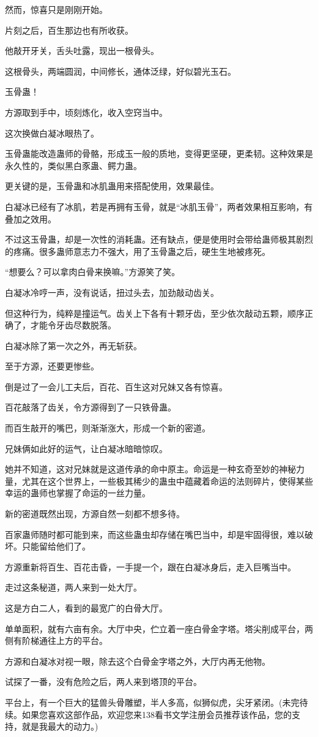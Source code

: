 \begin{this_body}
然而，惊喜只是刚刚开始。

片刻之后，百生那边也有所收获。

他敲开牙关，舌头吐露，现出一根骨头。

这根骨头，两端圆润，中间修长，通体泛绿，好似碧光玉石。

玉骨蛊！

方源取到手中，顷刻炼化，收入空窍当中。

这次换做白凝冰眼热了。

玉骨蛊能改造蛊师的骨骼，形成玉一般的质地，变得更坚硬，更柔韧。这种效果是永久性的，类似黑白豕蛊、鳄力蛊。

更关键的是，玉骨蛊和冰肌蛊用来搭配使用，效果最佳。

白凝冰已经有了冰肌，若是再拥有玉骨，就是“冰肌玉骨”，两者效果相互影响，有叠加之效用。

不过这玉骨蛊，却是一次性的消耗蛊。还有缺点，便是使用时会带给蛊师极其剧烈的疼痛。很多蛊师意志力不强大，用了玉骨蛊之后，硬生生地被疼死。

“想要么？可以拿肉白骨来换嘛。”方源笑了笑。

白凝冰冷哼一声，没有说话，扭过头去，加劲敲动齿关。

但这种行为，纯粹是撞运气。齿关上下各有十颗牙齿，至少依次敲动五颗，顺序正确了，才能令牙齿尽数脱落。

白凝冰除了第一次之外，再无斩获。

至于方源，还要更惨些。

倒是过了一会儿工夫后，百花、百生这对兄妹又各有惊喜。

百花敲落了齿关，令方源得到了一只铁骨蛊。

而百生敲开的嘴巴，则渐渐涨大，形成一个新的密道。

兄妹俩如此好的运气，让白凝冰暗暗惊叹。

她并不知道，这对兄妹就是这道传承的命中原主。命运是一种玄奇至妙的神秘力量，尤其在这个世界上，一些极其稀少的蛊虫中蕴藏着命运的法则碎片，使得某些幸运的蛊师也掌握了命运的一丝力量。

新的密道既然出现，方源自然一刻都不想多待。

百家蛊师随时都可能到来，而这些蛊虫却存储在嘴巴当中，却是牢固得很，难以破坏。只能留给他们了。

方源重新将百生、百花击昏，一手提一个，跟在白凝冰身后，走入巨嘴当中。

走过这条秘道，两人来到一处大厅。

这是方白二人，看到的最宽广的白骨大厅。

单单面积，就有六亩有余。大厅中央，伫立着一座白骨金字塔。塔尖削成平台，两侧有阶梯通往上方的平台。

方源和白凝冰对视一眼，除去这个白骨金字塔之外，大厅内再无他物。

试探了一番，没有危险之后，两人来到塔顶的平台。

平台上，有一个巨大的猛兽头骨雕塑，半人多高，似狮似虎，尖牙紧闭。(未完待续。如果您喜欢这部作品，欢迎您来138看书文学注册会员推荐该作品，您的支持，就是我最大的动力。)

\end{this_body}

